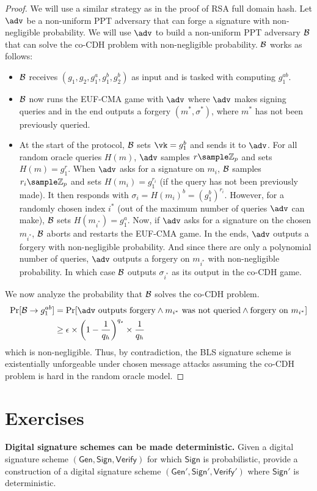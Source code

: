 \begin{proof}
    We will use a similar strategy as in the proof of RSA full domain hash. Let $\adv$ be a non-uniform PPT adversary that can forge a signature with non-negligible probability. We will use $\adv$ to build a non-uniform PPT adversary $\mathcal{B}$ that can solve the co-CDH problem with non-negligible probability.
    $\mathcal{B}$ works as follows:
    \begin{itemize}
        \item $\mathcal{B}$ receives $(g_1, g_2, g_1^a, g_1^b, g_2^b)$ as input and is tasked with computing $g_1^{ab}$.
        \item $\mathcal{B}$ now runs the EUF-CMA game with $\adv$ where $\adv$ makes signing queries and in the end outputs a forgery $(m^*, \sigma^*)$, where $m^*$ has not been previously queried.
        \item At the start of the protocol, $\mathcal{B}$ sets $\vk = g_1^b$ and sends it to $\adv$. For all random oracle queries $H(m)$, $\adv$ samples $r \sample \mathbb{Z}_p$ and sets $H(m) = g_1^r$. When $\adv$ asks for a signature on $m_i$, $\mathcal{B}$ samples $r_i \sample \mathbb{Z}_p$ and sets $H(m_i) = g_1^{r_i}$ (if the query has not been previously made). It then responds with $\sigma_i = H(m_i)^b = (g_1^b)^{r_i}$. However, for a randomly chosen index $i^*$ (out of the maximum number of queries $\adv$ can make), $\mathcal{B}$ sets $H(m_{i^*}) = g_1^a$. Now, if $\adv$ asks for a signature on the chosen $m_{i^*}$, $\mathcal{B}$ aborts and restarts the EUF-CMA game. In the ends, $\adv$ outputs a forgery with non-negligible probability. And since there are only a polynomial number of queries, $\adv$ outputs a forgery on $m_{i^*}$ with non-negligible probability. In which case $\mathcal{B}$ outputs $\sigma_{i^*}$ as its output in the co-CDH game.
    \end{itemize}

    We now analyze the probability that $\mathcal{B}$ solves the co-CDH problem.
    \begin{align*}
        \Pr[\advb \to g_1^{ab}] & = \Pr[\adv \text{ outputs forgery} \wedge m_{i^*} \text{ was not queried} \wedge \text{forgery on } m_{i^*}] \\
                                & \geq \epsilon \times \left( 1 -\frac{1}{q_h}\right)^{q_s} \times \frac{1}{q_h}
    \end{align*}
    which is non-negligible.
    Thus, by contradiction, the BLS signature scheme is existentially unforgeable under chosen message attacks assuming the co-CDH problem is hard in the random oracle model.
\end{proof}


\section*{Exercises}
\begin{exercise}
\textbf{Digital signature schemes can be made deterministic.} Given a digital signature scheme $(\mathsf{Gen}, \mathsf{Sign}, \mathsf{Verify})$ for which $\mathsf{Sign}$ is probabilistic, provide a construction of a digital signature scheme $(\mathsf{Gen}', \mathsf{Sign}', \mathsf{Verify}')$ where $\mathsf{Sign}'$ is deterministic.
\end{exercise}


